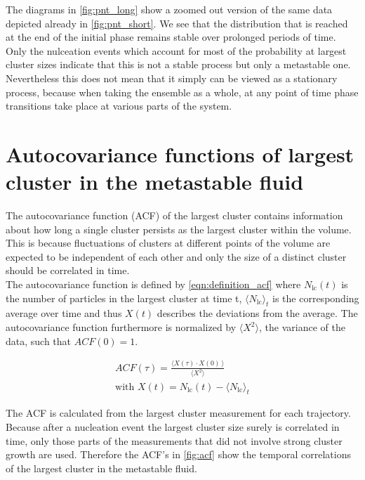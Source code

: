 The diagrams in \autoref{fig:pnt_long} show a zoomed out version of the same data depicted already in \autoref{fig:pnt_short}. We see that the distribution that is reached at the end of the initial phase remains stable over prolonged periods of time. Only the nulceation events which account for most of the probability at largest cluster sizes indicate that this is not a stable process but only a metastable one. Nevertheless this does not mean that it simply can be viewed as a stationary process, because when taking the ensemble as a whole, at any point of time phase transitions take place at various parts of the system.

\section{Autocovariance functions of largest cluster in the metastable fluid}
\label{sec:acf}
The autocovariance function (ACF) of the largest cluster contains information about how long a single cluster persists as the largest cluster within the volume. This is because fluctuations of clusters at different points of the volume are expected to be independent of each other and only the size of a distinct cluster should be correlated in time.\\

The autocovariance function is defined by \autoref{eqn:definition_acf} where $N_{\text{lc}}(t)$ is the number of particles in the largest cluster at time t, $\langle N_{\text{lc}} \rangle_t$ is the corresponding average over time and thus $X(t)$ describes the deviations from the average. The autocovariance function furthermore is normalized by ${ \langle X^2  \rangle }$, the variance of the data, such that $ACF(0) = 1 $.

\begin{align}
\label{eqn:definition_acf} 
ACF(\tau)=\frac{ \langle  X(\tau) \cdot  X(0) \! \: \rangle }{ \langle X^2  \rangle }\\  
\text{with } X(t)=N_{\text{lc}}(t)- \langle N_{\text{lc}} \rangle_t 
\end{align}

The ACF is calculated from the largest cluster measurement for each trajectory. Because after a nucleation event the largest cluster size surely is correlated in time, only those parts of the measurements that did not involve strong cluster growth are used. Therefore the ACF's in \autoref{fig:acf} show the temporal correlations of the largest cluster in the metastable fluid.\\

